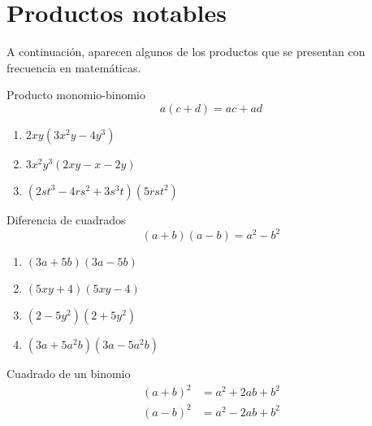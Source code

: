 \section{Productos notables}


	A continuaci\'on, aparecen algunos de los productos que se presentan con frecuencia en matemáticas.


{Producto monomio-binomio}
	\begin{equation}
		a(c+d)=ac+ad
	\end{equation}	



	\begin{problema}
		\begin{enumerate}
			\item $2xy\left( 3x^{2}y - 4y^{3}\right)$ 
			\item $3x^{2}y^{3}\left( 2xy-x-2y \right)$ 
			\item $\left( 2st^{3}-4rs^{2}+3s^{3}t \right)
			\left( 5rst^{2} \right)$
		\end{enumerate}
		
	\end{problema}
	



{Diferencia de cuadrados}
	\begin{equation}
		\left( a+b \right)\left( a-b \right)
		=a^{2}-b^{2}
	\end{equation}
	



	\begin{problema}
		\begin{enumerate}
			\item $\left( 3a+5b \right)\left( 3a-5b \right)$ 
			\item $\left( 5xy+4 \right)\left( 5xy-4 \right)$ 
			\item $\left( 2-5y^{2} \right)\left( 2+5y^{2} \right)$ 
			\item $\left( 3a+5a^{2}b \right)\left( 3a-5a^{2}b \right)$
		\end{enumerate}
		
	\end{problema}
	



{Cuadrado de un binomio}
	\begin{align}
		\left( a+b \right)^{2}&=
		a^{2}+2ab+b^{2}\\
		\left( a-b \right)^{2}&=
		a^{2}-2ab+b^{2}
	\end{align}
	



